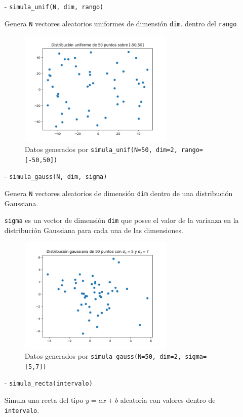 \documentclass{article}
\begin{document}
    \begin{enumerate}
        \item[-]\texttt{simula\_unif(N, dim, rango)} \par 
        Genera \texttt{N} vectores aleatorios uniformes de dimensión \texttt{dim}.
        dentro del \texttt{rango}

        \begin{figure}[h]
            \centering
            \caption{Datos generados por \texttt{simula\_unif(N=50, dim=2, rango=[-50,50])}}
            \includegraphics[width=0.7\textwidth]{uniform.png}
        \end{figure}
        \pagebreak
        \item[-]\texttt{simula\_gauss(N, dim, sigma)} \par
        Genera \texttt{N} vectores aleatorios  de dimensión \texttt{dim} dentro de una distribución Gaussiana.

        \texttt{sigma} es un vector de dimensión \texttt{dim} que posee el valor de la varianza en la
        distribución Gaussiana para cada una de las dimensiones.
        \begin{figure}[h]
            \centering
            \caption{Datos generados por \texttt{simula\_gauss(N=50, dim=2, sigma=[5,7])}}
            \includegraphics[width=0.7\textwidth]{gauss.png}
        \end{figure}
        \pagebreak
        \item[-]\texttt{simula\_recta(intervalo)} \par
        Simula una recta del tipo $y = ax + b$ aleatoria con valores dentro de \texttt{intervalo}.


\end{enumerate}
\end{document}
